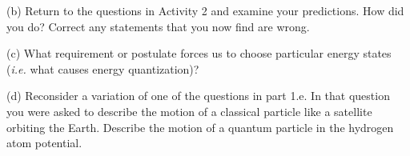 (b) Return to the questions in Activity 2 and examine your predictions.
How did you do?
Correct any statements that you now find are wrong.
\answerspace{2.0cm}

(c) What requirement or postulate forces us to choose particular energy states
({\it i.e.} what causes energy quantization)?
\answerspace{2.0cm}

\newpage

(d) Reconsider a variation of one of the questions in part 1.e.
In that question you were asked to describe the motion of a classical particle
like a satellite orbiting the Earth.
Describe the motion of a quantum particle in the hydrogen atom potential.
\answerspace{3.0cm}








